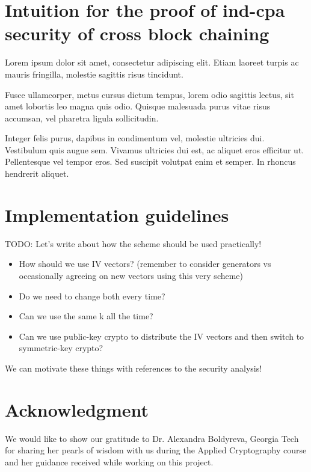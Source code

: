 \documentclass[conference]{IEEEtran}
\begin{document}
\section{Intuition for the proof of ind-cpa security of cross block chaining}

Lorem ipsum dolor sit amet, consectetur adipiscing elit. Etiam laoreet turpis ac mauris fringilla, molestie sagittis risus tincidunt.

Fusce ullamcorper, metus cursus dictum tempus, lorem odio sagittis lectus, sit amet lobortis leo magna quis odio. Quisque malesuada purus vitae risus accumsan, vel pharetra ligula sollicitudin.

Integer felis purus, dapibus in condimentum vel, molestie ultricies dui. Vestibulum quis augue sem. Vivamus ultricies dui est, ac aliquet eros efficitur ut. Pellentesque vel tempor eros. Sed suscipit volutpat enim et semper. In rhoncus hendrerit aliquet.

\section{Implementation guidelines}

{\color{red}
TODO: Let’s write about how the scheme should be used practically!
\begin{itemize}
  \item How should we use IV vectors? (remember to consider generators vs occasionally agreeing on new vectors using this very scheme)
  \item Do we need to change both every time?
  \item Can we use the same k all the time?
  \item Can we use public-key crypto to distribute the IV vectors and then switch to symmetric-key crypto?
\end{itemize}
We can motivate these things with references to the security analysis!
}



\section*{Acknowledgment}

We would like to show our gratitude to Dr. Alexandra Boldyreva, Georgia Tech for sharing her pearls of wisdom with us during the Applied Cryptography course and her guidance received while working on this project.
\end{document}
